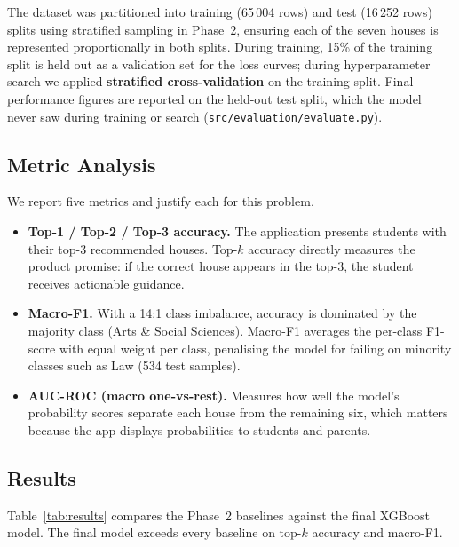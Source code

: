 The dataset was partitioned into training (65\,004 rows) and test
(16\,252 rows) splits using stratified sampling in Phase~2, ensuring
each of the seven houses is represented proportionally in both splits.
During training, 15\% of the training split is held out as a validation
set for the loss curves; during hyperparameter search we applied
\textbf{stratified cross-validation} on the training split. Final
performance figures are reported on the held-out test split, which the
model never saw during training or search
(\texttt{src/evaluation/evaluate.py}).

\subsection{Metric Analysis}

We report five metrics and justify each for this problem.

\begin{itemize}
  \item \textbf{Top-1 / Top-2 / Top-3 accuracy.}  The application
    presents students with their top-3 recommended houses. Top-$k$
    accuracy directly measures the product promise: if the correct house
    appears in the top-3, the student receives actionable guidance.

  \item \textbf{Macro-F1.}  With a 14:1 class imbalance, accuracy is
    dominated by the majority class (Arts \& Social Sciences).
    Macro-F1 averages the per-class F1-score with equal weight per
    class, penalising the model for failing on minority classes such
    as Law (534 test samples).

  \item \textbf{AUC-ROC (macro one-vs-rest).}  Measures how well the
    model's probability scores separate each house from the remaining
    six, which matters because the app displays probabilities to
    students and parents.
\end{itemize}

\subsection{Results}

Table~\ref{tab:results} compares the Phase~2 baselines against the final
XGBoost model. The final model exceeds every baseline on top-$k$ accuracy
and macro-F1.

